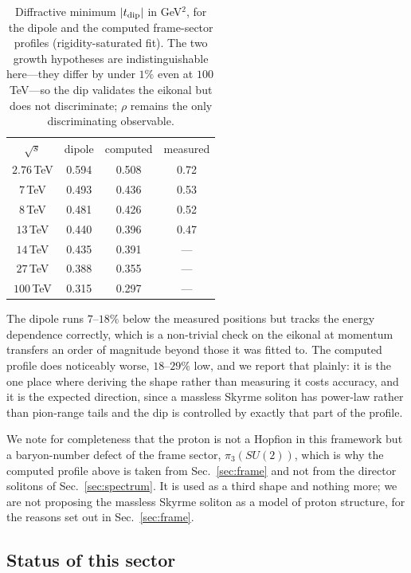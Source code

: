 \documentclass[aps,prd,preprint,nofootinbib,longbibliography]{revtex4-2}
\begin{document}
\begin{table}[t]
\caption{Diffractive minimum $|t_{\rm dip}|$ in GeV$^2$, for the dipole and the
computed frame-sector profiles (rigidity-saturated fit). The two growth
hypotheses are indistinguishable here---they differ by under $1\%$ even at
$100\,$TeV---so the dip validates the eikonal but does not discriminate;
$\rho$ remains the only discriminating observable.}
\label{tab:dip}
\begin{ruledtabular}
\begin{tabular}{cccc}
$\sqrt{s}$ & dipole & computed & measured \\
\colrule
$2.76\,$TeV & 0.594 & 0.508 & 0.72 \\
$7\,$TeV    & 0.493 & 0.436 & 0.53 \\
$8\,$TeV    & 0.481 & 0.426 & 0.52 \\
$13\,$TeV   & 0.440 & 0.396 & 0.47 \\
$14\,$TeV   & 0.435 & 0.391 & --- \\
$27\,$TeV   & 0.388 & 0.355 & --- \\
$100\,$TeV  & 0.315 & 0.297 & --- \\
\end{tabular}
\end{ruledtabular}
\end{table}

The dipole runs $7$--$18\%$ below the measured positions but tracks the energy
dependence correctly, which is a non-trivial check on the eikonal at momentum
transfers an order of magnitude beyond those it was fitted to. The computed
profile does noticeably worse, $18$--$29\%$ low, and we report that plainly: it
is the one place where deriving the shape rather than measuring it costs
accuracy, and it is the expected direction, since a massless Skyrme soliton has
power-law rather than pion-range tails and the dip is controlled by exactly that
part of the profile.

We note for completeness that the proton is not a Hopfion in this framework but a
baryon-number defect of the frame sector, $\pi_3(SU(2))$, which is why the
computed profile above is taken from Sec.~\ref{sec:frame} and not from the
director solitons of Sec.~\ref{sec:spectrum}. It is used as a third shape and
nothing more; we are not proposing the massless Skyrme soliton as a model of
proton structure, for the reasons set out in Sec.~\ref{sec:frame}.

\subsection{Status of this sector}
\end{document}
